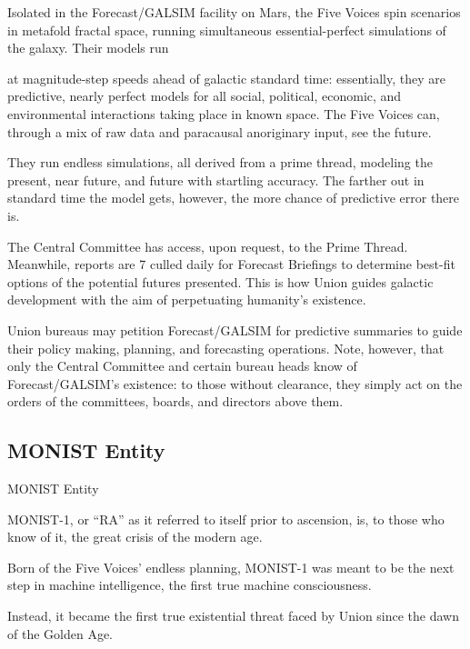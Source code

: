 Isolated in the Forecast/GALSIM facility on Mars, the Five Voices spin scenarios in metafold  
fractal space, running simultaneous essential-perfect simulations of the galaxy. Their models run  

                                                                                                          


at magnitude-step speeds ahead of galactic standard time: essentially, they are predictive, nearly  
perfect models for all social, political, economic, and environmental interactions taking place in  
known space. The Five Voices can, through a mix of raw data and paracausal anoriginary input,  
see the future. 
 

They run endless simulations, all derived from a prime thread, modeling the present, near future,  
and future with startling accuracy. The farther out in standard time the model gets, however, the  
more chance of predictive error there is.
 

The Central Committee has access, upon request, to the Prime Thread. Meanwhile, reports are  
                                                                                                       7 
culled daily for Forecast Briefings to determine best-fit options of the potential futures   
presented. This is how Union guides galactic development with the aim of perpetuating  
humanity’s existence.
 

Union bureaus may petition Forecast/GALSIM  for predictive summaries to guide their policy  
making, planning, and forecasting operations. Note, however, that only the Central Committee  
and certain bureau heads know of Forecast/GALSIM’s existence: to those without clearance,  
they simply act on the orders of the committees, boards, and directors above them.  
 
\subsection{MONIST Entity}
MONIST Entity   

MONIST-1, or “RA” as it referred to itself prior to ascension, is, to those who know of it, the great  
crisis of the modern age. 
 

Born of the Five Voices’ endless planning, MONIST-1 was meant to be the next step in machine  
intelligence, the first true machine consciousness. 
 

Instead, it became the first true existential threat faced by Union since the dawn of the Golden  
Age.
 

